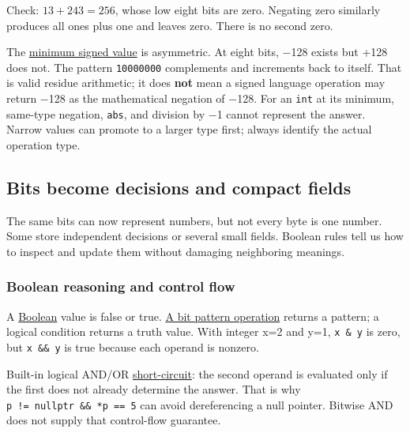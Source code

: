Check: \(13+243=256\), whose low eight bits are zero. Negating zero similarly produces all ones plus one and leaves zero. There is no second zero.

The \hyperref[appendix-05f39b10364d]{minimum signed value} is asymmetric. At eight bits, −128 exists but +128 does not. The pattern \texttt{10000000} complements and increments back to itself. That is valid residue arithmetic; it does \textbf{not} mean a signed language operation may return −128 as the mathematical negation of −128. For an \texttt{int} at its minimum, same-type negation, \texttt{abs}, and division by −1 cannot represent the answer. Narrow values can promote to a larger type first; always identify the actual operation type.

\subsection{Bits become decisions and compact fields}\label{01-foundations-i-ch001-bits-become-decisions-and-compact-fields}

\hypertarget{01-foundations-i-ch001-bits-become-decisions-and-compact-fields}{}

The same bits can now represent numbers, but not every byte is one number. Some store independent decisions or several small fields. Boolean rules tell us how to inspect and update them without damaging neighboring meanings.

\subsubsection{Boolean reasoning and control flow}\label{01-foundations-i-ch001-boolean-reasoning-and-control-flow}

\hypertarget{01-foundations-i-ch001-boolean-reasoning-and-control-flow}{}

A \hyperref[appendix-24475e1596a8]{Boolean} value is false or true. \hyperref[appendix-fe6b457d68d8]{A bit pattern operation} returns a pattern; a logical condition returns a truth value. With integer x=2 and y=1, \texttt{x\ \&\ y} is zero, but \texttt{x\ \&\&\ y} is true because each operand is nonzero.

Built-in logical AND/OR \hyperref[appendix-2e245a6fa8d3]{short-circuit}: the second operand is evaluated only if the first does not already determine the answer. That is why \texttt{p\ !=\ nullptr\ \&\&\ *p\ ==\ 5} can avoid dereferencing a null pointer. Bitwise AND does not supply that control-flow guarantee.

